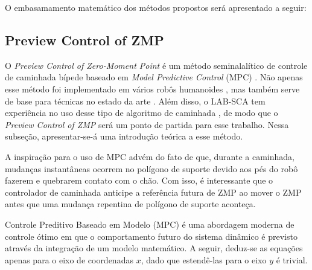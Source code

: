 

O embasamamento matemático dos métodos propostos será apresentado a seguir:


\subsection{Preview Control of ZMP}

O \emph{Preview Control of Zero-Moment Point} é um método seminalalítico de controle de caminhada bípede baseado em \emph{Model Predictive Control} (MPC) \cite{kajita2003}. Não apenas esse método foi implementado em vários robôs humanoides \cite{yi2016}, mas  também serve de base para técnicas no estado da arte \cite{tesemarcos,herdt2010}. Além disso, o LAB-SCA tem experiência no uso desse tipo de algoritmo de caminhada \cite{max22,tesemarcos}, de modo que o \emph{Preview Control of ZMP} será um ponto de partida para esse trabalho. Nessa subseção, apresentar-se-á uma introdução teórica a esse método.

A inspiração para o uso de MPC advém do fato de que, durante a caminhada, mudanças instantâneas ocorrem no polígono de suporte devido aos pés do robô fazerem e quebrarem contato com o chão. Com isso, é interessante que o controlador de caminhada anticipe a referência futura de ZMP ao mover o ZMP antes que uma mudança repentina de polígono de suporte aconteça.

Controle Preditivo Baseado em Modelo (MPC) é uma abordagem moderna de controle ótimo em que o comportamento futuro do sistema dinâmico é previsto através da integração de um modelo matemático. A seguir, deduz-se as equações apenas para o eixo de coordenadas \( x \), dado que estendê-las para o eixo \( y \) é trivial.

